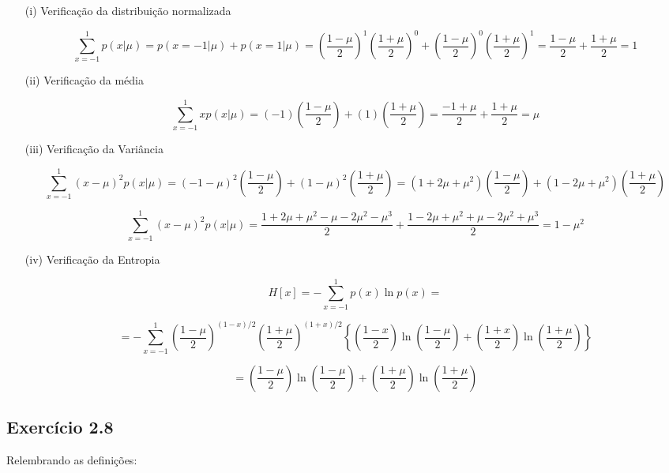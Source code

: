 \documentclass{article}
\begin{document}
   
   \begin{itemize}
   	\item [(i)] Verificação da distribuição normalizada
   	
   	  \[
   	    \sum_{x=-1}^{1} p(x|\mu) = p (x=-1|\mu)+p(x=1|\mu) =  \left(\frac{1-\mu}{2}\right)^{1}\left(\frac{1+\mu}{2}\right)^{0}+ \left(\frac{1-\mu}{2}\right)^{0}\left(\frac{1+\mu}{2}\right)^{1} = \frac{1-\mu}{2} + \frac{1+\mu}{2} = 1
   	   \]
   	
   	\item [(ii)] Verificação da média
   	
   	  \[
   	   \sum_{x=-1}^{1} x p(x|\mu) = (-1) \left(\frac{1-\mu}{2} \right) + (1) \left(\frac{1+\mu}{2} \right) = \frac{-1+\mu}{2} + \frac{1+\mu}{2} = \mu
   	  \]
   	
   	
   	\item [(iii)] Verificação da Variância
   	
   	  \[
   	   \sum_{x=-1}^{1} (x-\mu)^{2} p(x|\mu) = (-1-\mu)^{2} \left( \frac{1-\mu}{2} \right) + (1-\mu)^{2} \left( \frac{1+\mu}{2} \right) = (1+2\mu+\mu^{2})\left( \frac{1-\mu}{2} \right) + (1-2\mu+\mu^{2})\left( \frac{1+\mu}{2} \right)
   	  \]
   	  
   	  
   	  \[
   	     \sum_{x=-1}^{1} (x-\mu)^{2} p(x|\mu) = \frac{1+2\mu+\mu^{2}-\mu-2\mu^{2}-\mu^{3}}{2} + \frac{1-2\mu+\mu^{2}+\mu-2\mu^{2}+\mu^{3}}{2} = 1-\mu^{2}
   	  \]
   	 
   	
   	\item [(iv)] Verificação da Entropia
   	
   	 \[
   	  H[x]=-\sum_{x=-1}^{1} p(x) \ln p(x)= 
   	 \]
   	
   	\[
   	 = - \sum_{x=-1}^{1} \left(\frac{1-\mu}{2}\right)^{(1-x)/2}\left(\frac{1+\mu}{2}\right)^{(1+x)/2} \left\{ \left(\frac{1-x}{2}\right) \ln \left(\frac{1-\mu}{2}\right) +\left(\frac{1+x}{2}\right) \ln \left(\frac{1+\mu}{2}\right)  \right\}
   	\]
   	
   	\[
   	 = \left(\frac{1-\mu}{2}\right) \ln \left(\frac{1-\mu}{2}\right) +\left(\frac{1+\mu}{2}\right) \ln \left(\frac{1+\mu}{2}\right)
   	\]
   	
   	
   \end{itemize}
    
\subsection{ Exerc\'icio 2.8}

 Relembrando as definições:
 
\end{document}
